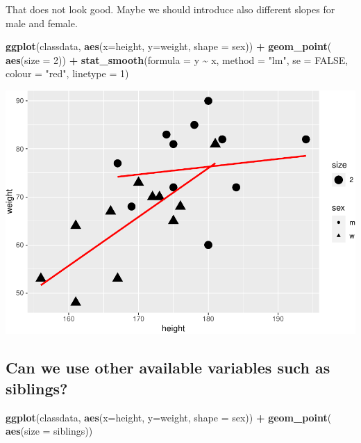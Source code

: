 \documentclass[
  doc]{apa6}
\newenvironment{Shaded}{\begin{snugshade}}{\end{snugshade}}
\newcommand{\AttributeTok}[1]{\textcolor[rgb]{0.13,0.29,0.53}{#1}}
\newcommand{\ConstantTok}[1]{\textcolor[rgb]{0.56,0.35,0.01}{#1}}
\newcommand{\DecValTok}[1]{\textcolor[rgb]{0.00,0.00,0.81}{#1}}
\newcommand{\FunctionTok}[1]{\textcolor[rgb]{0.13,0.29,0.53}{\textbf{#1}}}
\newcommand{\NormalTok}[1]{#1}
\newcommand{\SpecialCharTok}[1]{\textcolor[rgb]{0.81,0.36,0.00}{\textbf{#1}}}
\newcommand{\StringTok}[1]{\textcolor[rgb]{0.31,0.60,0.02}{#1}}
\begin{document}
\newpage

That does not look good. Maybe we should introduce also different slopes for male and female.

\begin{Shaded}
\begin{Highlighting}[]
\FunctionTok{ggplot}\NormalTok{(classdata, }\FunctionTok{aes}\NormalTok{(}\AttributeTok{x=}\NormalTok{height, }\AttributeTok{y=}\NormalTok{weight, }\AttributeTok{shape =}\NormalTok{ sex)) }\SpecialCharTok{+}
  \FunctionTok{geom\_point}\NormalTok{( }\FunctionTok{aes}\NormalTok{(}\AttributeTok{size =} \DecValTok{2}\NormalTok{)) }\SpecialCharTok{+}
  \FunctionTok{stat\_smooth}\NormalTok{(}\AttributeTok{formula =}\NormalTok{ y }\SpecialCharTok{\textasciitilde{}}\NormalTok{ x,  }\AttributeTok{method =} \StringTok{"lm"}\NormalTok{, }
              \AttributeTok{se =} \ConstantTok{FALSE}\NormalTok{, }\AttributeTok{colour =} \StringTok{"red"}\NormalTok{, }\AttributeTok{linetype =} \DecValTok{1}\NormalTok{)}
\end{Highlighting}
\end{Shaded}

\includegraphics{rmd_reg_files/figure-latex/unnamed-chunk-13-1.pdf}

\newpage

\hypertarget{can-we-use-other-available-variables-such-as-siblings}{%
\subsection{Can we use other available variables such as siblings?}\label{can-we-use-other-available-variables-such-as-siblings}}

\begin{Shaded}
\begin{Highlighting}[]
\FunctionTok{ggplot}\NormalTok{(classdata, }\FunctionTok{aes}\NormalTok{(}\AttributeTok{x=}\NormalTok{height, }\AttributeTok{y=}\NormalTok{weight, }\AttributeTok{shape =}\NormalTok{ sex)) }\SpecialCharTok{+}
  \FunctionTok{geom\_point}\NormalTok{( }\FunctionTok{aes}\NormalTok{(}\AttributeTok{size =}\NormalTok{ siblings)) }
\end{Highlighting}
\end{Shaded}
\end{document}
